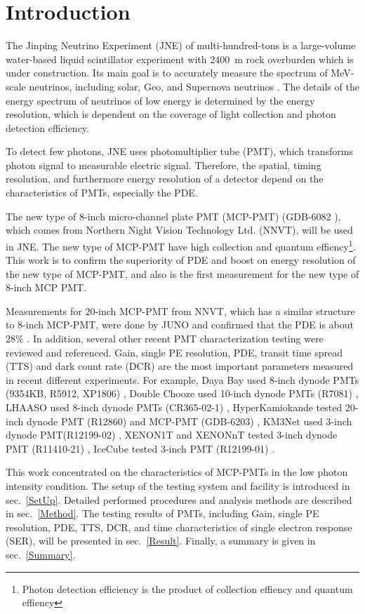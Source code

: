 \section{Introduction}
The Jinping Neutrino Experiment (JNE) of multi-hundred-tons is a large-volume water-based liquid scintillator experiment with \SI{2400}{m} rock overburden \cite{LetterJNE2017} which is under construction. Its main goal is to accurately measure the spectrum of MeV-scale neutrinos, including solar, Geo, and Supernova neutrinos \cite{LetterJNE2017}. The details of the energy spectrum of neutrinos of low energy is determined by the energy resolution, which is dependent on the coverage of light collection and photon detection efficiency.

To detect few photons, JNE uses photomultiplier tube (PMT), which transforms photon signal to measurable electric signal. Therefore, the spatial, timing resolution, and furthermore energy resolution of a detector depend on the characteristics of PMTs, especially the PDE.

The new type of 8-inch micro-channel plate PMT (MCP-PMT) (GDB-6082 \cite{GDB-6082}), which comes from Northern Night Vision Technology Ltd. (NNVT), will be used in JNE. The new type of MCP-PMT have high collection and quantum effiency\footnote{Photon detection efficiency is the product of collection effiency and quantum effiency}. This work is to confirm the superiority of PDE and boost on energy resolution of the new type of MCP-PMT, and also is the first measurement for the new type of 8-inch MCP PMT.

Measurements for 20-inch MCP-PMT from NNVT, which has a similar structure to 8-inch MCP-PMT, were done by JUNO and confirmed that the PDE is about 28\% \cite{JUNOMassTesting}. In addition, several other recent PMT characterization testing were reviewed and referenced. Gain, single PE resolution, PDE, transit time spread (TTS) and dark count rate (DCR) are the most important parameters measured in recent different experiments. For example, Daya Bay used 8-inch dynode PMTs (9354KB, R5912, XP1806) \cite{DayaBayTesting}, Double Chooze used 10-inch dynode PMTs (R7081) \cite{DoubleChoozeTesting}, LHAASO used 8-inch dynode PMTs (CR365-02-1) \cite{LHAASOTesting}, HyperKamiokande tested 20-inch dynode PMT (R12860) and MCP-PMT (GDB-6203) \cite{HyperKTesting}, KM3Net used 3-inch dynode PMT(R12199-02) \cite{KM3NetTesting}, XENON1T and XENONnT tested 3-inch dynode PMT (R11410-21) \cite{XENON1TTesting}\cite{XENONnTTesting}, IceCube tested 3-inch PMT (R12199-01) \cite{IceCubeTesting}.

This work concentrated on the characteristics of MCP-PMTs in the low photon intensity condition. The setup of the testing system and facility is introduced in sec.~\ref{SetUp}. Detailed performed procedures and analysis methods are described in sec.~\ref{Method}. The testing results of PMTs, including Gain, single PE resolution, PDE, TTS, DCR, and time characteristics of single electron response (SER), will be presented in sec.~\ref{Result}. Finally, a summary is given in sec.~\ref{Summary}.